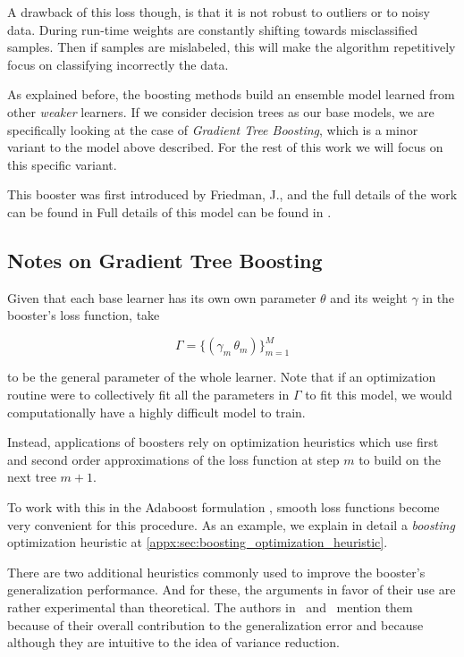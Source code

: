A drawback of this loss though, is that it is not robust to outliers or to noisy data.
During run-time weights are constantly shifting towards misclassified samples.
Then if samples are mislabeled, this will make the algorithm repetitively focus on classifying incorrectly the data.


As explained before, the boosting methods build an ensemble model learned from other \textit{weaker} learners.
If we consider decision trees as our base models, we are specifically looking at the case of \textit{Gradient Tree Boosting}, which is a minor variant to the model above described.
For the rest of this work we will focus on this specific variant.

This booster was first introduced by Friedman, J., and the full details of the work can be found in Full details of this model can be found in \citep{friedman-gradientBoosting2001}.


\subsection{Notes on Gradient Tree Boosting}\label{subsection:boosting_other_notes}

Given that each base learner has its own own parameter $\theta$  and its weight $\gamma$ in the booster's loss function, take

$$\Gamma = \{ (\gamma_m\,\theta_m) \}_{m=1}^M$$

to be the general parameter of the whole learner.
Note that if an optimization routine were to collectively fit all the parameters in $\Gamma$ to fit this model, we would computationally have a highly difficult model to train.

Instead, applications of boosters rely on optimization heuristics which use first and second order approximations of the loss function at step $m$ to build on the next tree $m+1$.

To work with this in the Adaboost formulation , smooth loss functions become very convenient for this procedure.
As an example, we explain in detail a \textit{boosting} optimization heuristic at \cref{appx:sec:boosting_optimization_heuristic}.

There are two additional heuristics commonly used to improve the booster's generalization performance.
And for these, the arguments in favor of their use are rather experimental than theoretical.
The authors in~\citep{hastie-elemstatslearn} and~\citep{bishop-patternecognition} mention them because of their overall contribution to the generalization error and because although they are intuitive to the idea of variance reduction.

